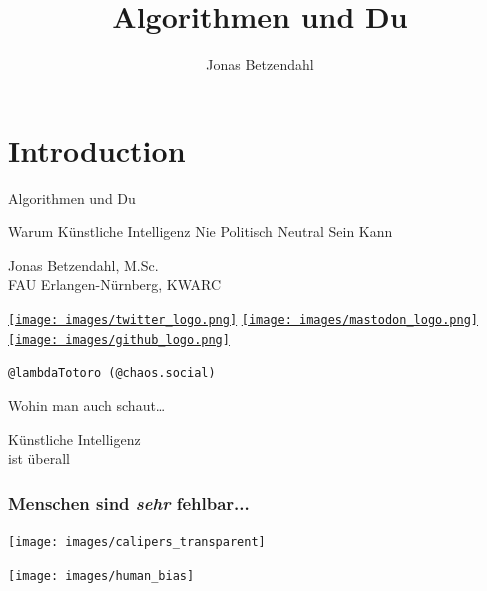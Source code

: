 \documentclass[aspectratio=169,usenames,dvipsnames]{beamer}
\author{Jonas Betzendahl}
\title{Algorithmen und Du}
\begin{document}
\section{Introduction}

\begin{frame}
\begin{center}
\vfill
\huge Algorithmen und Du
\normalsize 
\smallskip
\smallskip

Warum Künstliche Intelligenz Nie Politisch Neutral Sein Kann
\bigskip\bigskip

\large Jonas Betzendahl, M.Sc.\\\normalsize FAU Erlangen-Nürnberg, KWARC
\bigskip\bigskip\large

\href{https://twitter.com/lambdatotoro}{\texttt{[image: images/twitter\_logo.png]}}
\href{https://chaos.social/@lambdatotoro}{\texttt{[image: images/mastodon\_logo.png]}}
\href{https://github.com/lambdaTotoro}{\texttt{[image: images/github\_logo.png]}}

\texttt{@lambdaTotoro (@chaos.social)}
\end{center}
\end{frame}



\begin{frame}
\begin{center}
\LARGE
Wohin man auch schaut\dots
\bigskip

\Huge
Künstliche Intelligenz\\
ist überall
\end{center}
\end{frame}

\begin{frame}
\frametitle{Menschen sind \emph{sehr} fehlbar...}
\begin{minipage}{0.5\textwidth}
\begin{center}
\texttt{[image: images/calipers\_transparent]}
\end{center}
\end{minipage}\begin{minipage}{0.5\textwidth}
\begin{center}
\pause
\texttt{[image: images/human\_bias]}
\end{center}
\end{minipage}
\end{frame}
\end{document}
